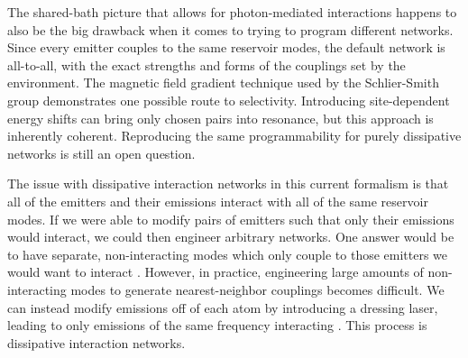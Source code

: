 \documentclass{article}
\begin{document}
The shared-bath picture that allows for photon-mediated interactions happens to also
be the big drawback when it comes to trying to program different networks. Since every
emitter couples to the same reservoir modes, the default network is all-to-all, with
the exact strengths and forms of the couplings set by the environment. The magnetic
field gradient technique used by the Schlier-Smith group demonstrates one possible
route to selectivity. Introducing site-dependent energy shifts can bring only chosen
pairs into resonance, but this approach is inherently coherent. Reproducing the same
programmability for purely dissipative networks is still an open question.

The issue with dissipative interaction networks in this current formalism is that all
of the emitters and their emissions interact with all of the same reservoir modes. If
we were able to modify pairs of emitters such that only their emissions would
interact, we could then engineer arbitrary networks. One answer
would be to have separate, non-interacting modes which only couple to those emitters
we would want to interact \cite{nair_topological_2023}. However, in practice, engineering large amounts
of non-interacting modes to generate nearest-neighbor couplings becomes difficult. We
can instead modify emissions off of each atom by introducing a dressing laser, leading
to only emissions of the same frequency interacting
\cite{vasudevan_engineering_nodate}. This process is 
dissipative interaction networks.


% 
% 
\printbibliography
\end{document}
